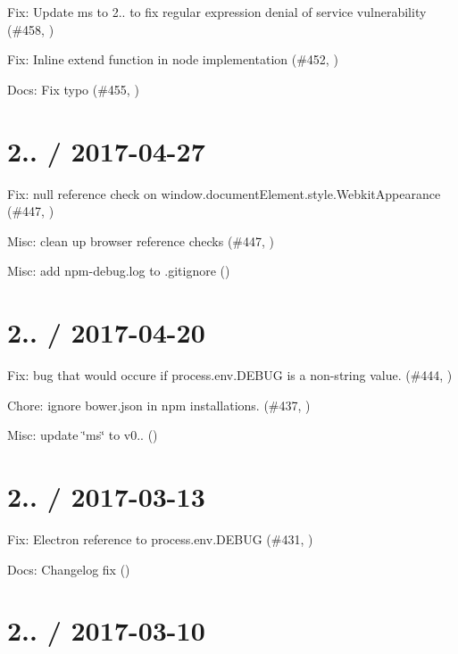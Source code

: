 
\begin{DoxyItemize}
\item Fix\+: Update ms to 2.. to fix regular expression denial of service vulnerability (\#458, )
\item Fix\+: Inline extend function in node implementation (\#452, )
\item Docs\+: Fix typo (\#455, )
\end{DoxyItemize}

\section*{2.. / 2017-\/04-\/27 }


\begin{DoxyItemize}
\item Fix\+: null reference check on window.\+document\+Element.\+style.\+Webkit\+Appearance (\#447, )
\item Misc\+: clean up browser reference checks (\#447, )
\item Misc\+: add npm-\/debug.\+log to .gitignore ()
\end{DoxyItemize}

\section*{2.. / 2017-\/04-\/20 }


\begin{DoxyItemize}
\item Fix\+: bug that would occure if process.\+env.\+D\+E\+B\+UG is a non-\/string value. (\#444, )
\item Chore\+: ignore bower.\+json in npm installations. (\#437, )
\item Misc\+: update \char`\"{}ms\char`\"{} to v0.. ()
\end{DoxyItemize}

\section*{2.. / 2017-\/03-\/13 }


\begin{DoxyItemize}
\item Fix\+: Electron reference to {\ttfamily process.\+env.\+D\+E\+B\+UG} (\#431, )
\item Docs\+: Changelog fix ()
\end{DoxyItemize}

\section*{2.. / 2017-\/03-\/10 }


